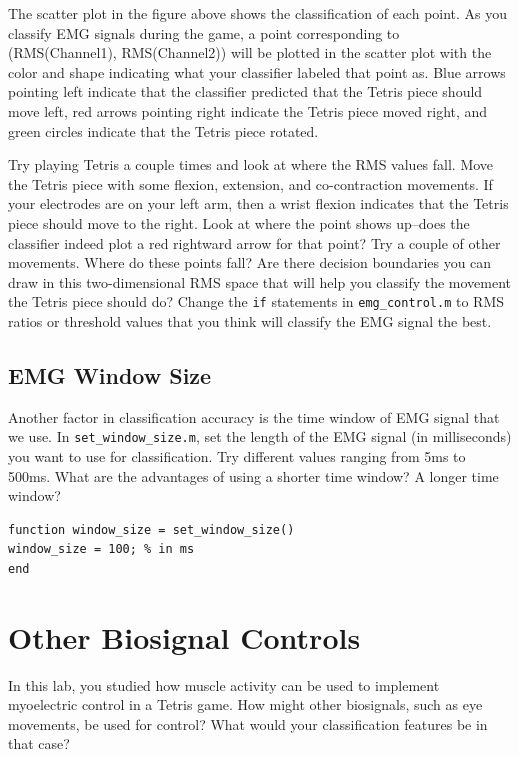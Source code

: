 \documentclass[10pt,oneside,a4paper]{article}
\begin{document}
The scatter plot in the figure above shows the classification of each point. As you classify EMG signals during the game, a point corresponding to (RMS(Channel1), RMS(Channel2)) will be plotted in the scatter plot with the color and shape indicating what your classifier labeled that point as. {\color{blue} Blue arrows} pointing left indicate that the classifier predicted that the Tetris piece should move left, {\color{red} red arrows} pointing right indicate the Tetris piece moved right, and {\color{green} green circles} indicate that the Tetris piece rotated.

Try playing Tetris a couple times and look at where the RMS values fall. Move the Tetris piece with some flexion, extension, and co-contraction movements. If your electrodes are on your left arm, then a wrist flexion indicates that the Tetris piece should move to the right. Look at where the point shows up--does the classifier indeed plot a red rightward arrow for that point? Try a couple of other movements. Where do these points fall? Are there decision boundaries you can draw in this two-dimensional RMS space that will help you classify the movement the Tetris piece should do? Change the \texttt{if} statements in \texttt{emg\_control.m} to RMS ratios or threshold values that you think will classify the EMG signal the best.
\subsection{EMG Window Size}
Another factor in classification accuracy is the time window of EMG signal that we use. In \texttt{set\_window\_size.m}, set the length of the EMG signal (in milliseconds) you want to use for classification. Try different values ranging from 5ms to 500ms. What are the advantages of using a shorter time window? A longer time window?
\begin{verbatim}
function window_size = set_window_size()
window_size = 100; % in ms
end
\end{verbatim}
\section{Other Biosignal Controls}
In this lab, you studied how muscle activity can be used to implement myoelectric control in a Tetris game. How might other biosignals, such as eye movements, be used for control? What would your classification features be in that case?
\end{document}
